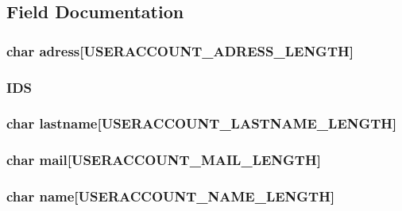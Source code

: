 \subsection{Field Documentation}
\hypertarget{struct_user_account_accd59deb6270e807cd96a582c141e631}{
\subsubsection[{adress}]{\setlength{\rightskip}{0pt plus 5cm}char adress\mbox{[}{\bf U\-S\-E\-R\-A\-C\-C\-O\-U\-N\-T\-\_\-\-A\-D\-R\-E\-S\-S\-\_\-\-L\-E\-N\-G\-T\-H}\mbox{]}}}\label{struct_user_account_accd59deb6270e807cd96a582c141e631}
\hypertarget{struct_user_account_a588d1e5ad85c65bc2b00e9432faadc0e}{
\subsubsection[{I\-D\-S}]{ I\-D\-S}}\label{struct_user_account_a588d1e5ad85c65bc2b00e9432faadc0e}
\hypertarget{struct_user_account_a570366d76c40b10dee4a3db834bc53be}{
\subsubsection[{lastname}]{\setlength{\rightskip}{0pt plus 5cm}char lastname\mbox{[}{\bf U\-S\-E\-R\-A\-C\-C\-O\-U\-N\-T\-\_\-\-L\-A\-S\-T\-N\-A\-M\-E\-\_\-\-L\-E\-N\-G\-T\-H}\mbox{]}}}\label{struct_user_account_a570366d76c40b10dee4a3db834bc53be}
\hypertarget{struct_user_account_aa9bbf7bea4117b927642aee2875821d9}{
\subsubsection[{mail}]{\setlength{\rightskip}{0pt plus 5cm}char mail\mbox{[}{\bf U\-S\-E\-R\-A\-C\-C\-O\-U\-N\-T\-\_\-\-M\-A\-I\-L\-\_\-\-L\-E\-N\-G\-T\-H}\mbox{]}}}\label{struct_user_account_aa9bbf7bea4117b927642aee2875821d9}
\hypertarget{struct_user_account_ab3f0e8a7b7c292feb10bb01486452533}{
\subsubsection[{name}]{\setlength{\rightskip}{0pt plus 5cm}char name\mbox{[}{\bf U\-S\-E\-R\-A\-C\-C\-O\-U\-N\-T\-\_\-\-N\-A\-M\-E\-\_\-\-L\-E\-N\-G\-T\-H}\mbox{]}}}\label{struct_user_account_ab3f0e8a7b7c292feb10bb01486452533}
